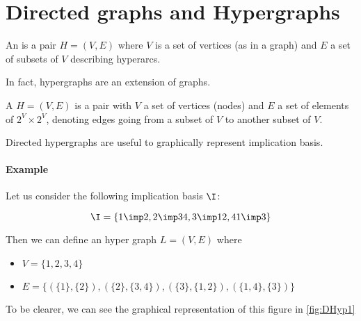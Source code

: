 \section{Directed graphs and Hypergraphs}

\begin{definition} An  is a pair $H = 
	(V, E)$ 
	where $V$ is a set of vertices (as in a graph) and $E$ a set of subsets of 
	$V$
	describing hyperarcs.
	
\end{definition}

\noindent In fact, hypergraphs are an extension of graphs. 


\begin{definition} A  
	$H = (V, E)$ is a pair with $V$ a set of vertices (nodes) and $E$ a set of 
	elements of $2^V \times 2^V$, denoting edges going from a subset of $V$ to 
	another subset of $V$.
	
\end{definition}

Directed hypergraphs are useful to graphically represent implication basis.

\paragraph{Example} Let us consider the following implication basis $\I$:

\[ \I = \{ 1 \imp 2, 2 \imp 34, 3 \imp 12, 41 \imp 3 \} \]

\noindent Then we can define an hyper graph $L = (V, E)$ where
\begin{itemize}
	\item $V = \{1, 2, 3, 4 \}$
	\item $E = \{ (\{ 1 \}, \{ 2\}), (\{ 2 \}, \{3, 4\}),
	(\{ 3 \}, \{ 1, 2\}), (\{1, 4\}, \{ 3\}) \}$
\end{itemize}

\noindent To be clearer, we can see the graphical representation of this figure
in \ref{fig:DHyp1}

\begin{center}
	
\end{center}